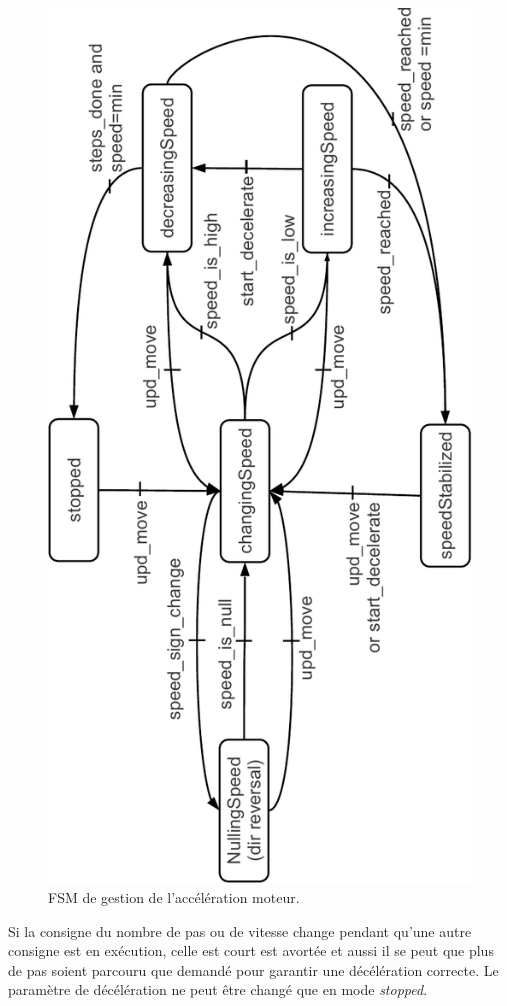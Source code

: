 \documentclass[11pt,a4paper,oneside,onecolumn]{article}
\begin{document}
\begin{figure}[th]
\begin{center}
\includegraphics[angle=-90,width=\textwidth]{./figs/MPPSYNC_speed_FSM}
\caption{FSM de gestion de l'accélération moteur.}
\label{MPPSYNC_speed_FSM}
\end{center}
\end{figure}
Si la consigne du nombre de pas ou de vitesse change pendant qu'une autre consigne est en exécution, celle est court est avortée et aussi il se peut que plus de pas soient parcouru que demandé pour garantir une décélération correcte. Le paramètre de décélération ne peut être changé que en mode \emph{stopped}.
\end{document}
